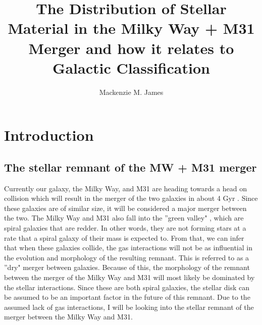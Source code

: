 \documentclass[twocolumn]{aastex63}
\begin{document}
\title{The Distribution of Stellar Material in the Milky Way + M31 Merger and how it relates to Galactic Classification}

\author{Mackenzie M. James}

\section{Introduction}

\subsection{The stellar remnant of the MW + M31 merger}
Currently our galaxy, the Milky Way, and M31 are heading towards a head on collision which will result in the merger of the two galaxies in about 4 Gyr \citep{2012ApJ...753....9V}. Since these galaxies are of similar size, it will be considered a major merger between the two. The Milky Way and M31 also fall into the ''green valley" \citep{2011ApJ...736...84M}, which are spiral galaxies that are redder. In other words, they are not forming stars at a rate that a spiral galaxy of their mass is expected to. From that, we can infer that when these galaxies collide, the gas interactions will not be as influential in the evolution and morphology of the resulting remnant. This is referred to as a ''dry" merger between galaxies. Because of this, the morphology of the remnant between the merger of the Milky Way and M31 will most likely be dominated by the stellar interactions. Since these are both spiral galaxies, the stellar disk can be assumed to be an important factor in the future of this remnant. Due to the assumed lack of gas interactions, I will be looking into the stellar remnant of the merger between the Milky Way and M31.
\end{document}
